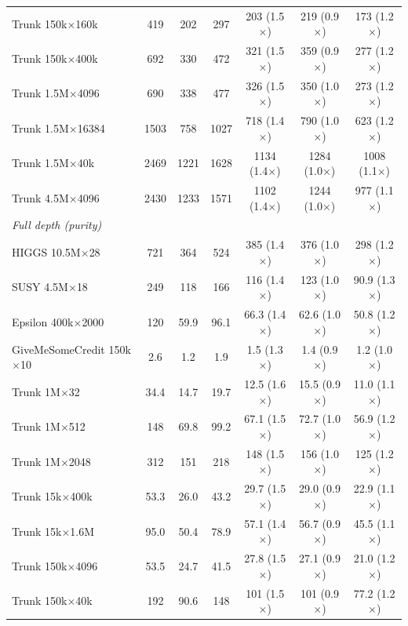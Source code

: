 \begin{table}[p]
\begin{tabular}{l|ccc|ccc}
        Trunk 150k$\times$160k & 419 & 202 & 297 & 203 (1.5$\times$) & 219 (0.9$\times$) & 173 (1.2$\times$) \\
        Trunk 150k$\times$400k & 692 & 330 & 472 & 321 (1.5$\times$) & 359 (0.9$\times$) & 277 (1.2$\times$) \\
        Trunk 1.5M$\times$4096 & 690 & 338 & 477 & 326 (1.5$\times$) & 350 (1.0$\times$) & 273 (1.2$\times$) \\
        Trunk 1.5M$\times$16384 & 1503 & 758 & 1027 & 718 (1.4$\times$) & 790 (1.0$\times$) & 623 (1.2$\times$) \\
        Trunk 1.5M$\times$40k & 2469 & 1221 & 1628 & 1134 (1.4$\times$) & 1284 (1.0$\times$) & 1008 (1.1$\times$) \\
        Trunk 4.5M$\times$4096 & 2430 & 1233 & 1571 & 1102 (1.4$\times$) & 1244 (1.0$\times$) & 977 (1.1$\times$) \\
        \hline
        \multicolumn{7}{l}{\textit{Full depth (purity)}} \\
        HIGGS 10.5M$\times$28 & 721 & 364 & 524 & 385 (1.4$\times$) & 376 (1.0$\times$) & 298 (1.2$\times$) \\
        SUSY 4.5M$\times$18 & 249 & 118 & 166 & 116 (1.4$\times$) & 123 (1.0$\times$) & 90.9 (1.3$\times$) \\
        Epsilon 400k$\times$2000 & 120 & 59.9 & 96.1 & 66.3 (1.4$\times$) & 62.6 (1.0$\times$) & 50.8 (1.2$\times$) \\
        GiveMeSomeCredit 150k$\times$10 & 2.6 & 1.2 & 1.9 & 1.5 (1.3$\times$) & 1.4 (0.9$\times$) & 1.2 (1.0$\times$) \\
        Trunk 1M$\times$32 & 34.4 & 14.7 & 19.7 & 12.5 (1.6$\times$) & 15.5 (0.9$\times$) & 11.0 (1.1$\times$) \\
        Trunk 1M$\times$512 & 148 & 69.8 & 99.2 & 67.1 (1.5$\times$) & 72.7 (1.0$\times$) & 56.9 (1.2$\times$) \\
        Trunk 1M$\times$2048 & 312 & 151 & 218 & 148 (1.5$\times$) & 156 (1.0$\times$) & 125 (1.2$\times$) \\
        Trunk 15k$\times$400k & 53.3 & 26.0 & 43.2 & 29.7 (1.5$\times$) & 29.0 (0.9$\times$) & 22.9 (1.1$\times$) \\
        Trunk 15k$\times$1.6M & 95.0 & 50.4 & 78.9 & 57.1 (1.4$\times$) & 56.7 (0.9$\times$) & 45.5 (1.1$\times$) \\
        Trunk 150k$\times$4096 & 53.5 & 24.7 & 41.5 & 27.8 (1.5$\times$) & 27.1 (0.9$\times$) & 21.0 (1.2$\times$) \\
        Trunk 150k$\times$40k & 192 & 90.6 & 148 & 101 (1.5$\times$) & 101 (0.9$\times$) & 77.2 (1.2$\times$) \\

\end{tabular}
\end{table}
